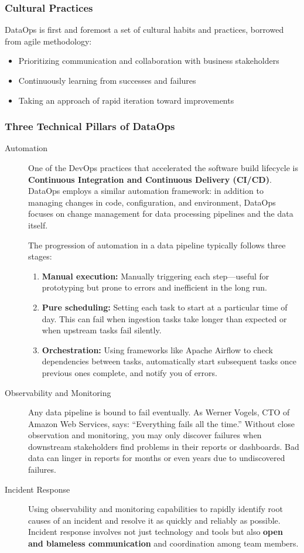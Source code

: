 \documentclass{article}
\begin{document}
\subsubsection{Cultural Practices}
DataOps is first and foremost a set of cultural habits and practices, borrowed from agile methodology:
\begin{itemize}
    \item Prioritizing communication and collaboration with business stakeholders
    \item Continuously learning from successes and failures
    \item Taking an approach of rapid iteration toward improvements
\end{itemize}

\subsubsection{Three Technical Pillars of DataOps}
\begin{description}
    \item[Automation] One of the DevOps practices that accelerated the software build lifecycle is \textbf{Continuous Integration and Continuous Delivery (CI/CD)}. DataOps employs a similar automation framework: in addition to managing changes in code, configuration, and environment, DataOps focuses on change management for data processing pipelines and the data itself.

    The progression of automation in a data pipeline typically follows three stages:
    \begin{enumerate}
        \item \textbf{Manual execution:} Manually triggering each step---useful for prototyping but prone to errors and inefficient in the long run.
        \item \textbf{Pure scheduling:} Setting each task to start at a particular time of day. This can fail when ingestion tasks take longer than expected or when upstream tasks fail silently.
        \item \textbf{Orchestration:} Using frameworks like Apache Airflow to check dependencies between tasks, automatically start subsequent tasks once previous ones complete, and notify you of errors.
    \end{enumerate}

    \item[Observability and Monitoring] Any data pipeline is bound to fail eventually. As Werner Vogels, CTO of Amazon Web Services, says: ``Everything fails all the time.'' Without close observation and monitoring, you may only discover failures when downstream stakeholders find problems in their reports or dashboards. Bad data can linger in reports for months or even years due to undiscovered failures.

    \item[Incident Response] Using observability and monitoring capabilities to rapidly identify root causes of an incident and resolve it as quickly and reliably as possible. Incident response involves not just technology and tools but also \textbf{open and blameless communication} and coordination among team members.
\end{description}
\end{document}
